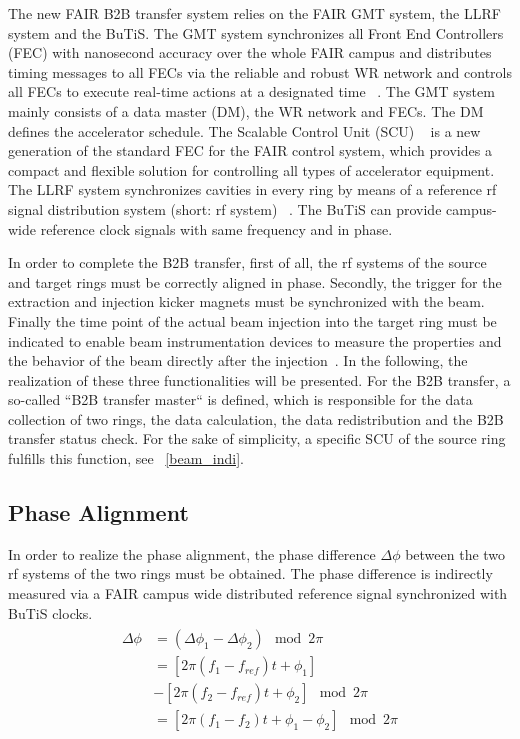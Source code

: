 The new FAIR B2B transfer system relies on the FAIR GMT system, the LLRF system and the BuTiS. The GMT system synchronizes all Front End Controllers (FEC) with nanosecond accuracy over the whole FAIR campus and distributes timing messages to all FECs via the reliable and robust WR network and controls all FECs to execute real-time actions at a designated time ~\cite{beck_new_2012}. The GMT system mainly consists of a data master (DM), the WR network and FECs. The DM defines the accelerator schedule. The Scalable Control Unit (SCU) ~\cite{kaiser_f-tn-c-008e_2014} is a new generation of the standard FEC for the FAIR control system, which provides a compact and flexible solution for controlling all types of accelerator equipment. The LLRF system synchronizes cavities in every ring by means of a reference rf signal distribution system (short: rf system) ~\cite{klingbeil_detailed_2013}. The BuTiS can provide campus-wide reference clock signals with same frequency and in phase.

In order to complete the B2B transfer, first of all, the rf systems of the source and target rings must be correctly aligned in phase. Secondly, the trigger for the extraction and injection kicker magnets must be synchronized with the beam. Finally the time point of the actual beam injection into the target ring must be indicated to enable beam instrumentation devices to measure the properties and the behavior of the beam directly after the injection~\cite{bai_f-tc-c-05_2016}. In the following, the realization of these three functionalities will be presented. For the B2B transfer, a so-called “B2B transfer master“ is defined, which is responsible for the data collection of two rings, the data calculation, the data redistribution and the B2B transfer status check. For the sake of simplicity, a specific SCU of the source ring fulfills this function, see ~\ref{beam_indi}.

\subsection{Phase Alignment}
In order to realize the phase alignment, the phase difference $\Delta \phi$ between the two rf systems of the two rings must be obtained. The phase difference is indirectly measured via a FAIR campus wide distributed reference signal synchronized with BuTiS clocks. 
\begin{eqnarray}
\begin{aligned}
	\Delta \phi&=(\Delta \phi_1-\Delta \phi_2) \mod 2\pi\\
&=[2\pi(f_1-f_\mathit{ref})t+\phi_1]\\
&-[2\pi(f_2-f_\mathit{ref})t+\phi_2] \mod 2\pi \\
&=[2\pi(f_1-f_2)t+\phi_1-\phi_2] \mod 2\pi
\end{aligned}
\end{eqnarray}

